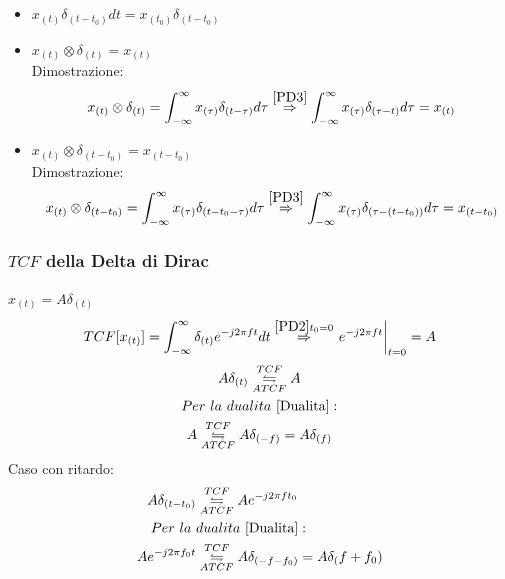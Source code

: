 \begin{itemize}
{                    }\label{PD3}
                    \item {
                        $x_{(t)}\delta_{(t-t_0)} dt = x_{(t_0)}\delta_{(t-t_0)}  $
                    }\label{PD4}
                    \item {
                        $x_{(t)} \otimes \delta_{(t)} = x_{(t)}$\\
                        Dimostrazione:
                        \[x_{(t)} \otimes \delta_{(t)} = \int_{-\infty}^{\infty}x_{(\tau)}\delta_{(t-\tau)} d\tau \overset{\ref{PD3}}{\Rightarrow} \int_{-\infty}^{\infty}x_{(\tau)}\delta_{(\tau-t)} d\tau = x_{(t)}\]
                    }\label{PD5}
                    \item {
                        $x_{(t)} \otimes \delta_{(t-t_0)} = x_{(t-t_0)}$\\
                        Dimostrazione:
                        \[x_{(t)} \otimes \delta_{(t-t_0)} = \int_{-\infty}^{\infty}x_{(\tau)}\delta_{(t-t_0-\tau)} d\tau \overset{\ref{PD3}}{\Rightarrow} \int_{-\infty}^{\infty}x_{(\tau)}\delta_{(\tau-(t-t_0))} d\tau = x_{(t-t_0)}\]
                    }\label{PD6}
                \end{itemize}
        \subsubsection{$TCF$ della Delta di Dirac}\label{TCF della Delta di Dirac}
                $x_{(t)} = A\delta_{(t)}$
                \[
                    TCF[x_{(t)}] = \int_{-\infty}^{\infty}\delta_{(t)}e^{-j2\pi ft} dt \overset{\ref{PD2} t_0=0}{\Rightarrow} \eval{e^{-j2\pi ft}}_{t=0} = A
                \]
                \begin{gather}
                        A\delta_{(t)} \overunderset{TCF}{ATCF}{\leftrightharpoons} A \nonumber \\
                        Per\ la\ dualita\ \ref{Dualita}: \nonumber \\
                        A \overunderset{TCF}{ATCF}{\leftrightharpoons} A\delta_{(-f)} = A\delta_{(f)}  \nonumber 
                \end{gather}
                Caso con ritardo:
                \begin{align}
                    A\delta_{(t-t_0)} &\overunderset{TCF}{ATCF}{\leftrightharpoons} Ae^{-j2\pi ft_0} \nonumber \\
                    Per\ la\ &dualita\ \ref{Dualita}: \nonumber \\
                    Ae^{-j2\pi f_0t} &\overunderset{TCF}{ATCF}{\leftrightharpoons} A\delta_{(-f-f_0)} =  A\delta_(f+f_0) \nonumber 
                \end{align}
